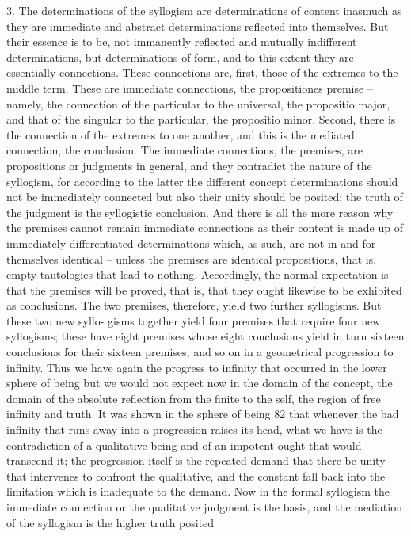 3. The determinations of the syllogism are determinations of content
inasmuch as they are immediate and abstract determinations reflected
into themselves. But their essence is to be, not immanently reflected and
mutually indifferent determinations, but determinations of form, and to this
extent they are essentially connections. These connections are, first, those
of the extremes to the middle term. These are immediate connections, the
propositiones premise – namely, the connection of the particular to the
universal, the propositio major, and that of the singular to the particular,
the propositio minor. Second, there is the connection of the extremes to one
another, and this is the mediated connection, the conclusion. The immediate
connections, the premises, are propositions or judgments in general, and
they contradict the nature of the syllogism, for according to the latter the
different concept determinations should not be immediately connected
but also their unity should be posited; the truth of the judgment is the
syllogistic conclusion. And there is all the more reason why the premises
cannot remain immediate connections as their content is made up of
immediately differentiated determinations which, as such, are not in and
for themselves identical – unless the premises are identical propositions,
that is, empty tautologies that lead to nothing.
Accordingly, the normal expectation is that the premises will be proved,
that is, that they ought likewise to be exhibited as conclusions. The two
premises, therefore, yield two further syllogisms. But these two new syllo-
gisms together yield four premises that require four new syllogisms; these
have eight premises whose eight conclusions yield in turn sixteen conclusions
for their sixteen premises, and so on in a geometrical progression to infinity.
Thus we have again the progress to infinity that occurred in the lower
sphere of being but we would not expect now in the domain of the concept,
the domain of the absolute reflection from the finite to the self, the region of
free infinity and truth. It was shown in the sphere of being 82 that whenever
the bad infinity that runs away into a progression raises its head, what we
have is the contradiction of a qualitative being and of an impotent ought
that would transcend it; the progression itself is the repeated demand that
there be unity that intervenes to confront the qualitative, and the constant
fall back into the limitation which is inadequate to the demand. Now in
the formal syllogism the immediate connection or the qualitative judgment
is the basis, and the mediation of the syllogism is the higher truth posited
